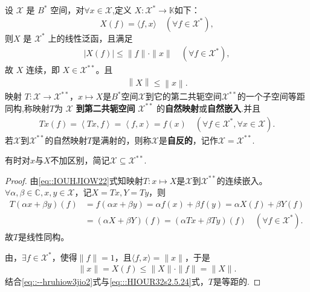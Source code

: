 \documentclass[../../main.tex]{subfiles}%
\begin{document}
\begin{theorem}\label{theorem:原空间可等距嵌入第二共轭空间}
设 $\mathscr{X}$ 是 $B^*$ 空间，对$\forall x \in \mathscr{X}$,定义 $X : \mathscr{X}^* \to \mathbb{K}$如下：
\[
X(f) = \langle f, x \rangle \quad (\forall f \in \mathscr{X}^*),
\]
则$X$ 是 $\mathscr{X}^*$ 上的线性泛函，且满足
\begin{align}\label{eq::IOUHJIOW22}
|X(f)| \leqslant \|f\| \cdot \|x\| \quad (\forall f \in \mathscr{X}^*),
\end{align}
故 $X$ 连续，即 $X \in \mathscr{X}^{**}$。且
\begin{align}\label{eq::--hruhiow3jio2}
\left\| X \right\| \leqslant \left\| x \right\| .
\end{align}
映射 $T : \mathscr{X} \to \mathscr{X}^{**}$，$x\mapsto X$是$B^*$空间$\mathscr{X}$到它的第二共轭空间$\mathscr{X}^{**}$的一个子空间等距同构,称映射$T$为 $\mathscr{X}$ \textbf{到第二共轭空间} $\mathscr{X}^{**}$ 的\textbf{自然映射}或\textbf{自然嵌入}.并且
\begin{align*}
Tx\left( f \right) =\left< Tx,f \right> =\left< f,x \right> =f\left( x \right) \quad \left( \forall f\in \mathscr{X} ^*,\forall x\in \mathscr{X} \right) .
\end{align*}
若$\mathscr{X}$到$\mathscr{X}^{**}$的自然映射$T$是满射的，则称$\mathscr{X}$是\textbf{自反的}，记作$\mathscr{X}=\mathscr{X}^{**}$.
\end{theorem}
\begin{remark}
有时对$x$与$X$不加区别，简记$\mathscr{X}\subseteq\mathscr{X}^{**}$.
\end{remark}
\begin{proof}

由\eqref{eq::IOUHJIOW22}式知映射$T:x\mapsto X$是$\mathscr{X}$到$\mathscr{X}^{**}$的连续嵌入。$\forall \alpha,\beta\in\mathbb{C},x,y\in\mathscr{X}$，记$X=Tx,Y=Ty$，则
\begin{align*}
T(\alpha x+\beta y)(f)&=f(\alpha x+\beta y)
=\alpha f(x)+\beta f(y)=\alpha X(f)+\beta Y(f)\\
&=(\alpha X+\beta Y)(f)=(\alpha Tx+\beta Ty)(f)\quad (\forall f\in\mathscr{X}^*).
\end{align*}
故$T$是线性同构。

由，$\exists f\in\mathscr{X}^*$，使得$\|f\|=1$，且$\langle f,x\rangle=\|x\|$，于是
\begin{align}
\|x\|=X(f)\leqslant\|X\|\cdot\|f\|=\|X\|. \label{eq:::HIOUR32s2.5.24}
\end{align}
结合\eqref{eq::--hruhiow3jio2}式与\eqref{eq:::HIOUR32s2.5.24}式，$T$是等距的.

\end{proof}
\end{document}
